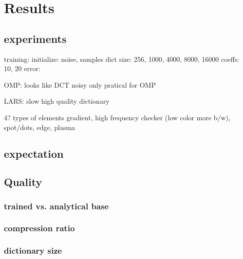 \chapter{Results}
\section{experiments}
training:
  initialize: noise, samples 
  dict size: 256, 1000, 4000, 8000, 16000 
  coeffs: 10, 20
  error:

OMP:
  looks like DCT 
  noisy
  only pratical for OMP

LARS:
  slow 
  high quality dictionary
  
  4? types of elements
  gradient, high frequency checker (low color more b/w), spot/dots, edge, plasma

\section{expectation}

\section{Quality}
\subsection{trained vs. analytical base}
\subsection{compression ratio}
\subsection{dictionary size}




